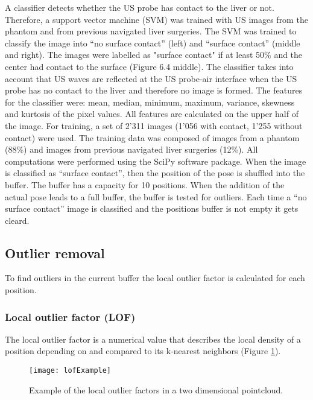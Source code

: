 A classifier detects whether the US probe has contact to the liver or not. Therefore, a support vector machine (SVM) was trained with US images
from the phantom and from previous navigated liver surgeries. The SVM was trained to
classify the image into ``no surface contact'' (left) and ``surface contact'' (middle and right).
The images were labelled as "surface contact" if at least 50\% and the center had contact
to the surface (Figure 6.4 middle). The classifier takes into account that US waves are
reflected at the US probe-air interface when the US probe has no contact to the liver and
therefore no image is formed. The features for the classifier were: mean, median, minimum,
maximum, variance, skewness and kurtosis of the pixel values. All features are calculated
on the upper half of the image. For training, a set of 2'311 images (1'056 with contact, 1'255
without contact) were used. The training data was composed of images from a phantom
(88\%) and images from previous navigated liver surgeries (12\%). All computations were
performed using the SciPy software package. When the image is classified as ``surface contact'', then the position of the pose is shuffled
into the buffer. The buffer has a capacity for 10 positions. When
the addition of the actual pose leads to a full buffer, the buffer is
tested for outliers.
Each time a ``no surface contact'' image is classified and the positions buffer
is not empty it gets cleard.
\subsection{Outlier removal}
To find outliers in the current buffer the local
outlier factor is calculated for each position. 

\subsubsection{Local outlier factor (LOF)}
The local outlier factor is a numerical value that describes the local density
of a position depending on and compared to its k-nearest neighbors (Figure
\ref{fig:lofExample}).

\begin{figure}[H]
  \centering
 \texttt{[image: lofExample]}
  \caption{Example of the local outlier factors in a two dimensional pointcloud.}
  \label{fig:lofExample}
\end{figure}

